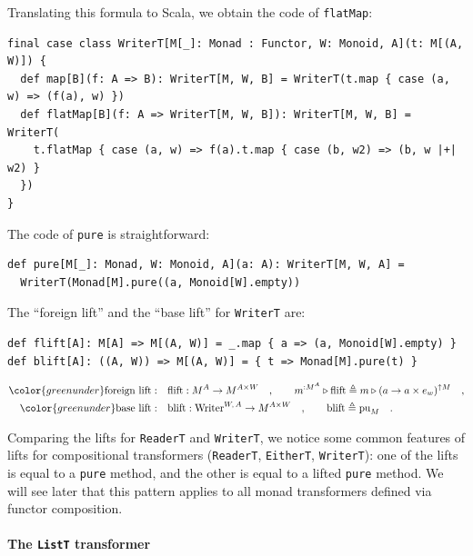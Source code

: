 Translating this formula to Scala, we obtain the code of \lstinline!flatMap!:
\begin{lstlisting}
final case class WriterT[M[_]: Monad : Functor, W: Monoid, A](t: M[(A, W)]) {
  def map[B](f: A => B): WriterT[M, W, B] = WriterT(t.map { case (a, w) => (f(a), w) })
  def flatMap[B](f: A => WriterT[M, W, B]): WriterT[M, W, B] = WriterT(
    t.flatMap { case (a, w) => f(a).t.map { case (b, w2) => (b, w |+| w2) }  
  })
}  
\end{lstlisting}
The code of \lstinline!pure! is straightforward:
\begin{lstlisting}
def pure[M[_]: Monad, W: Monoid, A](a: A): WriterT[M, W, A] =
  WriterT(Monad[M].pure((a, Monoid[W].empty))
\end{lstlisting}
The \textsf{``}foreign lift\textsf{''} and the \textsf{``}base lift\textsf{''} for \lstinline!WriterT!
are:
\begin{lstlisting}
def flift[A]: M[A] => M[(A, W)] = _.map { a => (a, Monoid[W].empty) }
def blift[A]: ((A, W)) => M[(A, W)] = { t => Monad[M].pure(t) }
\end{lstlisting}
\begin{align*}
{\color{greenunder}\text{foreign lift}:}\quad & \text{flift}:M^{A}\rightarrow M^{A\times W}\quad,\quad\quad m^{:M^{A}}\triangleright\text{flift}\triangleq m\triangleright(a\rightarrow a\times e_{w})^{\uparrow M}\quad,\\
{\color{greenunder}\text{base lift}:}\quad & \text{blift}:\text{Writer}^{W,\,A}\rightarrow M^{A\times W}\quad,\quad\quad\text{blift}\triangleq\text{pu}_{M}\quad.
\end{align*}

Comparing the lifts for \lstinline!ReaderT! and \lstinline!WriterT!,
we notice some common features of lifts for compositional transformers
(\lstinline!ReaderT!, \lstinline!EitherT!, \lstinline!WriterT!):
one of the lifts is equal to a \lstinline!pure! method, and the other
is equal to a lifted \lstinline!pure! method. We will see later that
this pattern applies to all monad transformers defined via functor
composition.

\paragraph{The \texttt{ListT} transformer}

